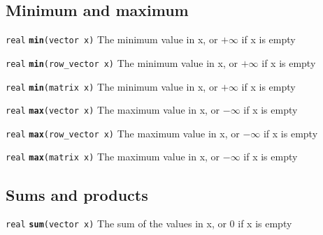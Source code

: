 \documentclass[
  10pt,
]{book}
\begin{document}
\hypertarget{minimum-and-maximum-1}{%
\subsection{Minimum and maximum}\label{minimum-and-maximum-1}}


\texttt{real} \textbf{\texttt{min}}\texttt{(vector\ x)}\newline
The minimum value in x, or \(+\infty\) if x is empty


\texttt{real} \textbf{\texttt{min}}\texttt{(row\_vector\ x)}\newline
The minimum value in x, or \(+\infty\) if x is empty


\texttt{real} \textbf{\texttt{min}}\texttt{(matrix\ x)}\newline
The minimum value in x, or \(+\infty\) if x is empty


\texttt{real} \textbf{\texttt{max}}\texttt{(vector\ x)}\newline
The maximum value in x, or \(-\infty\) if x is empty


\texttt{real} \textbf{\texttt{max}}\texttt{(row\_vector\ x)}\newline
The maximum value in x, or \(-\infty\) if x is empty


\texttt{real} \textbf{\texttt{max}}\texttt{(matrix\ x)}\newline
The maximum value in x, or \(-\infty\) if x is empty

\hypertarget{sums-and-products}{%
\subsection{Sums and products}\label{sums-and-products}}


\texttt{real} \textbf{\texttt{sum}}\texttt{(vector\ x)}\newline
The sum of the values in x, or 0 if x is empty
\end{document}
